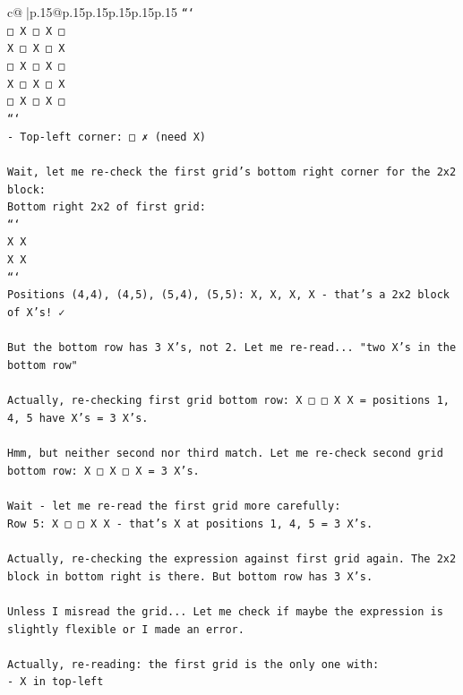 \documentclass{article}
\begin{document}
{\begin{supertabular}{c@{$\;$}|p{.15\linewidth}@{}p{.15\linewidth}p{.15\linewidth}p{.15\linewidth}p{.15\linewidth}p{.15\linewidth}}
{{{\texttt{```} \\
\texttt{□ X □ X □} \\
\texttt{X □ X □ X} \\
\texttt{□ X □ X □} \\
\texttt{X □ X □ X} \\
\texttt{□ X □ X □} \\
\texttt{```} \\
\texttt{{-} Top{-}left corner: □ ✗ (need X)} \\
\\ 
\texttt{Wait, let me re{-}check the first grid's bottom right corner for the 2x2 block:} \\
\texttt{Bottom right 2x2 of first grid:} \\
\texttt{```} \\
\texttt{X X} \\
\texttt{X X} \\
\texttt{```} \\
\texttt{Positions (4,4), (4,5), (5,4), (5,5): X, X, X, X {-} that's a 2x2 block of X's! ✓} \\
\\ 
\texttt{But the bottom row has 3 X's, not 2. Let me re{-}read... "two X's in the bottom row"} \\
\\ 
\texttt{Actually, re{-}checking first grid bottom row: X □ □ X X = positions 1, 4, 5 have X's = 3 X's.} \\
\\ 
\texttt{Hmm, but neither second nor third match. Let me re{-}check second grid bottom row: X □ X □ X = 3 X's.} \\
\\ 
\texttt{Wait {-} let me re{-}read the first grid more carefully:} \\
\texttt{Row 5: X □ □ X X {-} that's X at positions 1, 4, 5 = 3 X's.} \\
\\ 
\texttt{Actually, re{-}checking the expression against first grid again. The 2x2 block in bottom right is there. But bottom row has 3 X's.} \\
\\ 
\texttt{Unless I misread the grid... Let me check if maybe the expression is slightly flexible or I made an error.} \\
\\ 
\texttt{Actually, re{-}reading: the first grid is the only one with:} \\
\texttt{{-} X in top{-}left} \\
}}}
\end{supertabular}}
\end{document}
